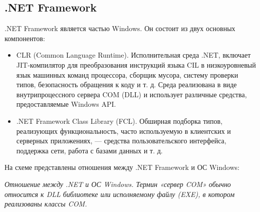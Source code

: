 \documentclass[14pt, a4paper]{article}
\begin{document}
\begin{centering}
    \subsection*{.NET Framework}
\end{centering}

.NET Framework является частью Windows. Он состоит из двух основных компонентов:
\begin{itemize}
    \item CLR (Common Language Runtime). Исполнительная среда .NET, включает JIT-компилятор
    для преобразования инструкций языка CIL в низкоуровневый язык машинных команд процессора,
    сборщик мусора, систему проверки типов, безопасность обращения к коду и т. д.
    Среда реализована в виде внутрипроцессного сервера COM (DLL) и использует различные средства,
    предоставляемые Windows API.
    \item .NET Framework Class Library (FCL). Обширная подборка типов, реализующих функциональность,
    часто используемую в клиентских и серверных приложениях, — средства пользовательского интерфейса,
    поддержка сети, работа с базами данных и т. д.
\end{itemize}


На схеме представлены отношения между .NET Framework и ОС \linebreak[4]Windows:
\begin{figure}[h]%
    \centering
    \label{framework} %
\end{figure} \newpage


\textit{Отношение между .NET и ОС Windows. Термин «сервер COM» обычно относится к DLL библиотеке или
исполняемому файлу (EXE), в котором реализованы классы COM.}
\end{document}
